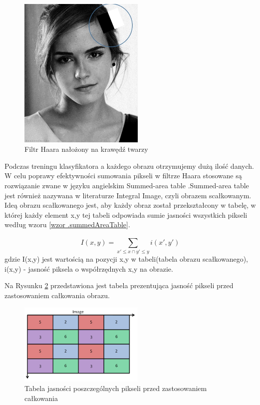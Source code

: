\documentclass[a4paper,twoside,12pt]{book}
\begin{document}
    \begin{figure}
        \centering
        \includegraphics[width=6cm]{Obrazy/haarEmmaWatson.jpg}
        \caption{Filtr Haara nałożony na krawędź twarzy \cite{haar}}
        \label{fig.haarEmmaWatson}
    \end{figure}

    Podczas treningu klasyfikatora
    a każdego obrazu otrzymujemy dużą ilość danych.
    W celu poprawy efektywności sumowania pikseli w filtrze Haara stosowane są
    rozwiązanie zwane w języku angielskim Summed-area table \cite{violaJonesRealTimeOb}.Summed-area table jest również
    nazywana w literaturze Integral Image, czyli obrazem scałkowanym.
    Ideą obrazu scałkowanego jest,
    aby każdy obraz
    został
    przekształcony w
    tabelę, w której każdy element x,y tej tabeli odpowiada sumie jasności wszystkich pikseli według wzoru \ref{wzor
    .summedAreaTable}.

    \large
    \begin{equation}
        I(x,y) = \sum_{{x}'\leq x \cap {y}'\leq y}^{} i({x}',{y}')
        \label{wzor.summedAreaTable}
    \end{equation}
    \normalsize
    gdzie I(x,y) jest wartością na pozycji x,y w tabeli(tabela obrazu scałkowanego), i(x,y) - jasność piksela o
    współrzędnych x,y na obrazie.

    Na Rysunku \ref{fig.przedCalkowaniem} przedstawiona jest tabela prezentująca jasność pikseli przed
    zastosowaniem całkowania obrazu.
    \begin{figure}
        \centering
        \includegraphics[width=6cm]{Obrazy/przedCalkowaniem.jpg}
        \caption{Tabela jasności poszczególnych pikseli przed zastosowaniem całkowania \cite{integralImages}}
        \label{fig.przedCalkowaniem}
    \end{figure}
\end{document}
